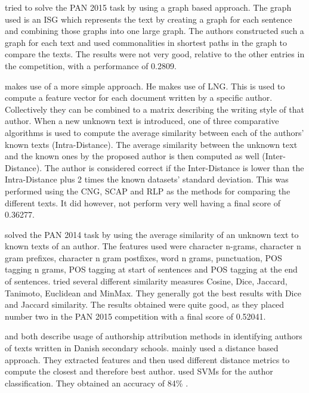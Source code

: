 \cite{gomezadorno2015} tried to solve the PAN 2015 task by using a graph based
approach. The graph used is an \gls{ISG} which represents the text by creating
a graph for each sentence and combining those graphs into one large graph.
The authors constructed such a graph for each text and used commonalities in
shortest paths in the graph to compare the texts. The results were not very
good, relative to the other entries in the competition, with a performance of
0.2809.

\cite{layton:2014} makes use of a more simple approach. He makes use of
\gls{LNG}. This is used to compute a feature vector for each document written
by a specific author. Collectively they can be combined to a matrix describing
the writing style of that author. When a new unknown text is introduced, one of
three comparative algorithms is used to compute the average similarity between
each of the authors' known texts (Intra-Distance). The average similarity between
the unknown text and the known ones by the proposed author is then computed as
well (Inter-Distance). The author is considered correct if the Inter-Distance
is lower than the Intra-Distance plus 2 times the known datasets' standard
deviation. This was performed using the \gls{CNG}, \gls{SCAP} and \gls{RLP} as
the methods for comparing the different texts. It did however, not perform very
well having a final score of 0.36277.

\cite{castro2015} solved the PAN 2014 task by using the average similarity of
an unknown text to known texts of an author. The features used were character
n-grams, character n gram prefixes, character n gram postfixes, word n grams,
punctuation, \gls{POS} tagging n grams, \gls{POS} tagging at start of sentences
and \gls{POS} tagging at the end of sentences. \cite{castro2015} tried several
different similarity measures Cosine, Dice, Jaccard, Tanimoto, Euclidean and
MinMax. They generally got the best results with Dice and Jaccard similarity.
The results obtained were quite good, as they placed number two in the PAN 2015
competition with a final score of 0.52041.

\cite{hansen2014} and \cite{aalykke2016} both describe usage of authorship
attribution methods in identifying authors of texts written in Danish secondary
schools. \cite{aalykke2016} mainly used a distance based approach. They
extracted features and then used different distance metrics to compute the
closest and therefore best author. \cite{hansen2014} used \gls{SVM}s for the
author classification. They obtained an accuracy of 84\% .
